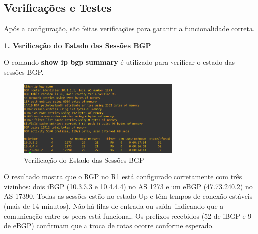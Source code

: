 \documentclass[11pt,english, openright, oneside]{book}
\begin{document}
\pagebreak
\subsection{Verificações e Testes}
\vspace{0.2cm}
Após a configuração, são feitas verificações para garantir a funcionalidade correta.
\vspace{0.4cm}

\textbf{1. Verificação do Estado das Sessões BGP} \par
O comando \textbf{show ip bgp summary} é utilizado para verificar o estado das sessões BGP. \par
\begin{figure}[H]
  \centering
  \includegraphics[width=0.70\textwidth]{imagens/Tarefa2/6.bgp_R1.png}
  \caption{Verificação do Estado das Sessões BGP}
  \label{fig:tarefa2_teste1}
\end{figure}

O resultado mostra que o BGP no R1 está configurado corretamente com três vizinhos: dois iBGP (10.3.3.3 e 10.4.4.4) no AS 1273 e um eBGP (47.73.240.2) no AS 17390. Todas as sessões estão no estado Up e têm tempos de conexão estáveis (mais de 14 minutos). Não há filas de entrada ou saída, indicando que a comunicação entre os peers está funcional. Os prefixos recebidos (52 de iBGP e 9 de eBGP) confirmam que a troca de rotas ocorre conforme esperado.
\end{document}
